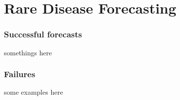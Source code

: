 \section{Rare Disease Forecasting}

\subsubsection{Successful forecasts}
somethings here

\subsubsection{Failures}

some examples here

